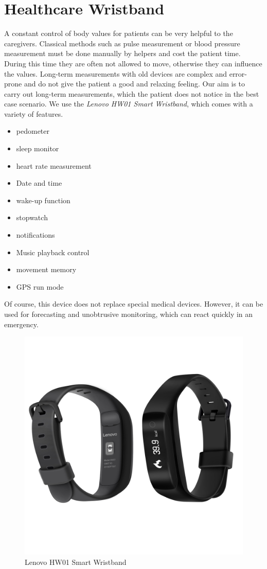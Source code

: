 \section{Healthcare Wristband}
A constant control of body values for patients can be very helpful to the caregivers. Classical methods such as pulse measurement or blood pressure measurement must be done manually by helpers and cost the patient time. During this time they are often not allowed to move, otherwise they can influence the values. Long-term measurements with old devices are complex and error-prone and do not give the patient a good and relaxing feeling. Our aim is to carry out long-term measurements, which the patient does not notice in the best case scenario. We use the \textit{Lenovo HW01 Smart Wristband}, which comes with a variety of features. 
\begin{itemize}
	\item pedometer
	\item sleep monitor
	\item heart rate measurement
	\item Date and time
	\item wake-up function
	\item stopwatch
	\item notifications
	\item Music playback control
	\item movement memory
	\item GPS run mode
\end{itemize}
\newpage
Of course, this device does not replace special medical devices. However, it can be used for forecasting and unobtrusive monitoring, which can react quickly in an emergency.

\begin{figure}[h]
	\centering
	\includegraphics[width=.5\textwidth, trim=1cm 4cm 2cm 4cm, clip]{images/CostAnalysis/LenovoHW01} 
	\caption[Lenovo HW01 Smart Wristband]{Lenovo HW01 Smart Wristband\footnotemark}
	\label{fig:lenovoHealth}
\end{figure}
\newpage
